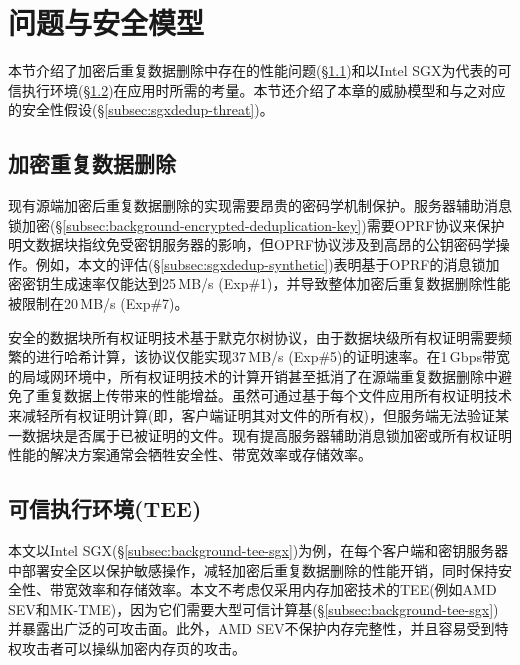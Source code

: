 \section{问题与安全模型}
\label{sec:sgxdedup-background}

本节介绍了加密后重复数据删除中存在的性能问题(\S\ref{subsec:sgxdedup-problem})和以Intel SGX为代表的可信执行环境(\S\ref{subsec:sgxdedup-sgx})在应用时所需的考量。本节还介绍了本章的威胁模型和与之对应的安全性假设(\S\ref{subsec:sgxdedup-threat})。

\subsection{加密重复数据删除}
\label{subsec:sgxdedup-problem}

现有源端加密后重复数据删除的实现需要昂贵的密码学机制保护。服务器辅助消息锁加密(\S\ref{subsec:background-encrypted-deduplication-key})需要OPRF协议\cite{naor2004Number}来保护明文数据块指纹免受密钥服务器的影响，但OPRF协议涉及到高昂的公钥密码学操作。例如，本文的评估(\S\ref{subsec:sgxdedup-synthetic})表明基于OPRF的消息锁加密密钥生成速率仅能达到25\,MB/s (Exp\#1)，并导致整体加密后重复数据删除性能被限制在20\,MB/s (Exp\#7)。

安全的数据块所有权证明技术基于默克尔树协议，由于数据块级所有权证明需要频繁的进行哈希计算，该协议仅能实现37\,MB/s (Exp\#5)的证明速率。在1\,Gbps带宽的局域网环境中，所有权证明技术的计算开销甚至抵消了在源端重复数据删除中避免了重复数据上传带来的性能增益。虽然可通过基于每个文件应用所有权证明技术来减轻所有权证明计算(即，客户端证明其对文件的所有权)，但服务端无法验证某一数据块是否属于已被证明的文件。现有提高服务器辅助消息锁加密或所有权证明性能的解决方案通常会牺牲安全性\cite{li2020TED,xu2013weak,pietro12}、带宽效率\cite{harnik2010side,li15}或存储效率\cite{zhou2015secdep,qin17,li2020TED}。


\subsection{可信执行环境(TEE)}
\label{subsec:sgxdedup-sgx} 

本文以Intel SGX\cite{sgx}(\S\ref{subsec:background-tee-sgx})为例，在每个客户端和密钥服务器中部署安全区以保护敏感操作，减轻加密后重复数据删除的性能开销，同时保持安全性、带宽效率和存储效率。本文不考虑仅采用内存加密技术的TEE(例如AMD SEV\cite{AMDSEV}和MK-TME\cite{MK-TME})，因为它们需要大型可信计算基(\S\ref{subsec:background-tee-sgx})并暴露出广泛的可攻击面\cite{mofrad18}。此外，AMD SEV\cite{AMDSEV}不保护内存完整性，并且容易受到特权攻击者可以操纵加密内存页\cite{mofrad18}的攻击。


